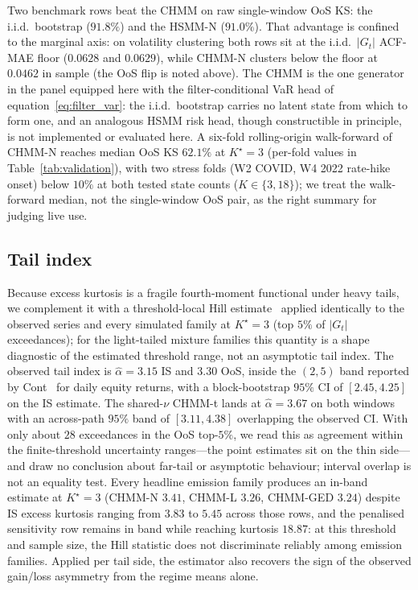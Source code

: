 Two benchmark rows beat the CHMM on raw single-window OoS KS: the i.i.d.\ bootstrap ($91.8\%$) and the HSMM-N ($91.0\%$). That advantage is confined to the marginal axis: on volatility clustering both rows sit at the i.i.d.\ $|G_t|$ ACF-MAE floor ($0.0628$ and $0.0629$), while CHMM-N clusters below the floor at $0.0462$ in sample (the OoS flip is noted above). The CHMM is the one generator in the panel equipped here with the filter-conditional VaR head of equation~\eqref{eq:filter_var}: the i.i.d.\ bootstrap carries no latent state from which to form one, and an analogous HSMM risk head, though constructible in principle, is not implemented or evaluated here. A six-fold rolling-origin walk-forward of CHMM-N reaches median OoS KS $62.1\%$ at $K^\star = 3$ (per-fold values in Table~\ref{tab:validation}), with two stress folds (W2 COVID, W4 2022 rate-hike onset) below $10\%$ at both tested state counts ($K \in \{3, 18\}$); we treat the walk-forward median, not the single-window OoS pair, as the right summary for judging live use.

\subsection{Tail index}
\label{sec:res_tail}

Because excess kurtosis is a fragile fourth-moment functional under heavy tails, we complement it with a threshold-local Hill estimate~\cite{hill1975tail} applied identically to the observed series and every simulated family at $K^\star = 3$ (top $5\%$ of $|G_t|$ exceedances); for the light-tailed mixture families this quantity is a shape diagnostic of the estimated threshold range, not an asymptotic tail index. The observed tail index is $\hat\alpha = 3.15$ IS and $3.30$ OoS, inside the $(2, 5)$ band reported by Cont~\cite{cont2001empirical} for daily equity returns, with a block-bootstrap $95\%$ CI of $[2.45, 4.25]$ on the IS estimate. The shared-$\nu$ CHMM-t lands at $\hat\alpha = 3.67$ on both windows with an across-path $95\%$ band of $[3.11, 4.38]$ overlapping the observed CI. With only about $28$ exceedances in the OoS top-$5\%$, we read this as agreement within the finite-threshold uncertainty ranges---the point estimates sit on the thin side---and draw no conclusion about far-tail or asymptotic behaviour; interval overlap is not an equality test. Every headline emission family produces an in-band estimate at $K^\star = 3$ (CHMM-N $3.41$, CHMM-L $3.26$, CHMM-GED $3.24$) despite IS excess kurtosis ranging from $3.83$ to $5.45$ across those rows, and the penalised sensitivity row remains in band while reaching kurtosis $18.87$: at this threshold and sample size, the Hill statistic does not discriminate reliably among emission families. Applied per tail side, the estimator also recovers the sign of the observed gain/loss asymmetry from the regime means alone.

